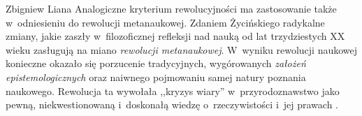 \begin{artplenv}{Zbigniew Liana}
Analogiczne kryterium rewolucyjności ma zastosowanie także w~odniesieniu do rewolucji metanaukowej. Zdaniem Życińskiego
\parencites*[s.~126]{zycinski_elementy_1996}[por.][s.~101]{zycinski_jezyk_1983}
radykalne zmiany, jakie zaszły w~filozoficznej refleksji nad
nauką od lat trzydziestych XX wieku zasługują na miano \textit{rewolucji metanaukowej}. W~wyniku rewolucji naukowej
konieczne okazało się porzucenie tradycyjnych, wygórowanych \textit{założeń epistemologicznych} oraz naiwnego pojmowaniu
samej natury poznania naukowego. Rewolucja ta wywołała ,,kryzys wiary'' w~przyrodoznawstwo jako pewną, niekwestionowaną i~doskonałą
wiedzę o~rzeczywistości i~jej prawach
\parencite[zob.][s.~102]{zycinski_jezyk_1983}.


\end{artplenv}
